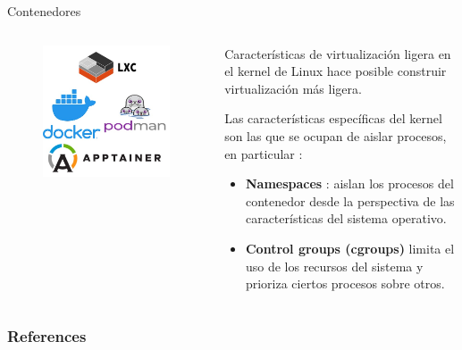 \documentclass[11pt]{beamer}
\begin{document}
\begin{frame}{Contenedores}
	\begin{columns}
\begin{column}{0.5\textwidth}

  \begin{figure}
  	\includegraphics[scale=0.3]{images/contenedores_tecnologias}
  \end{figure}
\end{column}

	\vspace{-0.5cm}

\begin{column}{0.5\textwidth}  %
	
	Características de virtualización ligera en el kernel de Linux hace posible construir virtualización más ligera. 

	\vspace{0.2cm}
	
	Las características específicas del kernel son las que se ocupan de aislar procesos, en particular \citep{nemeth2018unix}:
	
		\begin{itemize}
			\item \textbf{Namespaces} : aislan los procesos del contenedor desde la perspectiva de las características del sistema operativo.
			\item \textbf{Control groups (cgroups)} limita el uso de los recursos del sistema y prioriza ciertos procesos sobre otros.
					\end{itemize}

	
\end{column}
\end{columns}
\end{frame}

\begin{frame}[allowframebreaks]
        \frametitle{References}
		

       
\end{frame}
\end{document}
